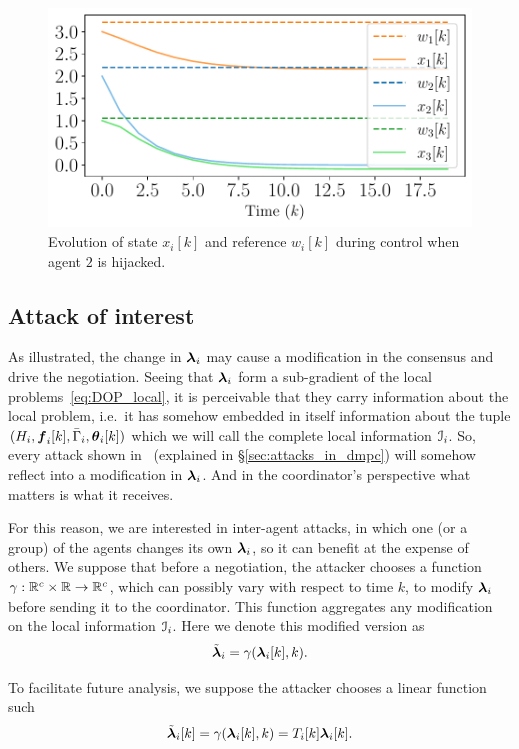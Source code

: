 \documentclass[../main.tex]{subfiles}
\begin{document}
\begin{figure}[h]
  \centering
  \includegraphics[width=.5\textwidth]{../img/example_liar_state.pdf}
  \caption{Evolution of state $x_{i}[k]$ and reference $w_{i}[k]$ during control when agent $2$ is hijacked. }\label{fig:example_liar_state}
\end{figure}

\subsection{Attack of interest}\label{sec:attack-interest}

As illustrated, the change in $\boldsymbol{\lambda}_i$ may cause a modification in the consensus and drive the negotiation.
Seeing that $\boldsymbol{\lambda}_i$ form a sub-gradient of the local problems~\eqref{eq:DOP_local}, it is perceivable that they carry information about the local problem, i.e.\ it has somehow embedded in itself information about the tuple $(H_{i},\vec{f}_{i}[k],\bar{\Gamma}_{i},\thetaik)$ which we will call the complete local information $\mathcal{I}_{i}$.
So, every attack shown in~\cite{VelardeEtAl2018} (explained in \S\ref{sec:attacks_in_dmpc}) will somehow reflect into a modification in $\boldsymbol{\lambda}_i$.
And in the coordinator's perspective what matters is what it receives.

For this reason, we are interested in inter-agent \fdi{} attacks, in which one (or a group) of the agents changes its own $\boldsymbol{\lambda}_i$, so it can benefit at the expense of others.
We suppose that before a negotiation, the attacker chooses a function ${\gamma:\mathbb{R}^{c}\times\mathbb{R}\to \mathbb{R}^{c}}$, which can possibly vary with respect to time $k$, to modify $\boldsymbol{\lambda}_i$ before sending it to the coordinator.
This function aggregates any modification on the local information $\mathcal{I}_{i}$.
Here we denote this modified version as
\begin{equation}
  \tilde{\vec{\lambda}}_{i}=\gamma(\lambdaik,k).
\end{equation}

To facilitate future analysis, we suppose the attacker chooses a linear function such
\begin{equation}
  \label{eq:linear_attack}
  \tilde{\vec{\lambda}}_{i}[k]=\gamma(\lambdaik,k)=T_{i}[k]\lambdaik.
\end{equation}
\end{document}
